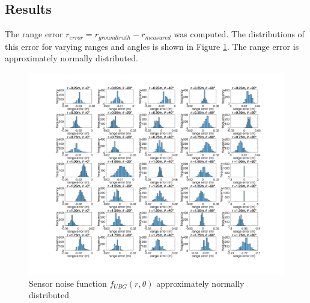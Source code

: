 	\subsection{Results}
		The range error $r_{error} = r_{ground truth} - r_{measured}$ was computed. The distributions of this error for varying ranges and angles is shown in Figure \ref{fig:mean_hist}. The range error is approximately normally distributed.
		\begin{figure}
		\centering
		  \includegraphics[width=1\textwidth,trim = 0mm 0mm 0mm 0mm,clip]{./Figures/range_error_histograms.jpg}
		  \caption{Sensor noise function $f_{UBG}(r,\theta)$ approximately normally distributed}
		  \label{fig:mean_hist}
		\end{figure}
		
